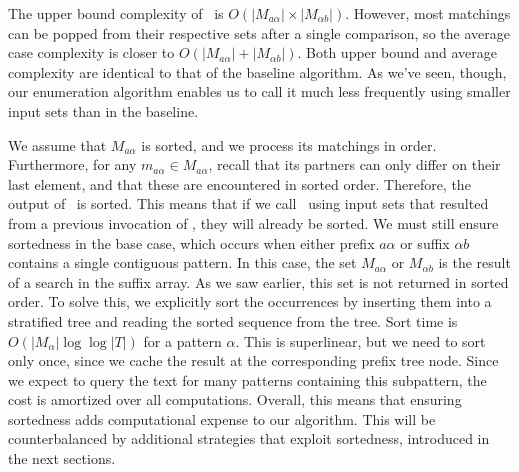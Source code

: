 The upper bound complexity of \queryfunc\ is $O(|M_{a\alpha}| \times |M_{\alpha{}b}|)$.
However, most matchings can be popped from their respective sets after a single
comparison, so the average case complexity is closer to 
$O(|M_{a\alpha}| + |M_{\alpha{}b}|)$.  Both upper bound and average complexity are
identical to that of the baseline algorithm.  As we've seen, though, our
enumeration algorithm enables us to call it much less frequently using
smaller input sets than in the baseline.

We assume that $M_{a\alpha}$ is
sorted, and we process its matchings in order.  Furthermore, for any
$m_{a\alpha} \in M_{a\alpha}$, recall that its partners can only differ
on their last element, and that these are encountered in sorted order.
Therefore, the output of \queryfunc\ is sorted.  This means that
if we call \queryfunc\ using input sets that resulted from a previous
invocation of \queryfunc, they will already be sorted.
We must still ensure sortedness in the base case, which occurs when 
either prefix $a\alpha$ or suffix $\alpha{}b$ contains a single
contiguous pattern.  In this case, the set $M_{a\alpha}$ or
$M_{\alpha{}b}$ is the result of a search in the suffix array.
As we saw earlier, this set is not returned in sorted
order.  To solve this, we explicitly sort the occurrences by inserting
them into a stratified tree \citep{emde-boas:1977:mst} and
reading the sorted sequence from the tree.  Sort
time is $O(|M_\alpha| \log\log |T|)$ for a pattern $\alpha$.
This is superlinear, but we need to sort only
once, since we cache the result at the corresponding
prefix tree node.  Since we expect to query the text for many patterns containing this
subpattern, the cost is amortized over all computations.
Overall, this means that ensuring sortedness
adds computational expense to our algorithm.  
This will be counterbalanced by additional strategies that exploit
sortedness, introduced in the next sections.
